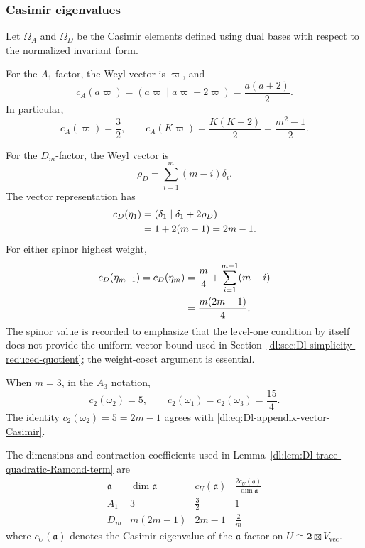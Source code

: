 \documentclass[11pt,reqno]{amsart}
\theoremstyle{definition}
\theoremstyle{remark}
\begin{document}
\subsubsection{Casimir eigenvalues}


Let \(\Omega_A\) and \(\Omega_D\) be the Casimir elements defined using
dual bases with respect to the normalized invariant form.

For the \(A_1\)-factor, the Weyl vector is \(\varpi\), and
\begin{equation*}
  c_A(a\varpi)
  =
  (a\varpi\mid a\varpi+2\varpi)
  =
  \frac{a(a+2)}2.
\end{equation*}
In particular,
\begin{equation*}
  c_A(\varpi)=\frac32,
  \qquad
  c_A(K\varpi)
  =
  \frac{K(K+2)}2
  =
  \frac{m^2-1}{2}.
\end{equation*}

For the \(D_m\)-factor, the Weyl vector is
\begin{equation*}
  \rho_D
  =
  \sum_{i=1}^{m}(m-i)\delta_i.
\end{equation*}
The vector representation has
\begin{align}
  c_D(\eta_1)
  &=
  (\delta_1\mid\delta_1+2\rho_D)
  \notag\\
  &=
  1+2(m-1)
  =
  2m-1.
  \label{dl:eq:Dl-appendix-vector-Casimir}
\end{align}
For either spinor highest weight,
\begin{align*}
  c_D(\eta_{m-1})
  =
  c_D(\eta_m)
  &=
  \frac m4
  +
  \sum_{i=1}^{m-1}(m-i)
  \notag\\
  &=
  \frac{m(2m-1)}4.
\end{align*}
The spinor value is recorded to emphasize that the level-one
condition by itself does not provide the uniform vector bound used in
Section~\ref{dl:sec:Dl-simplicity-reduced-quotient}; the weight-coset
argument is essential.

When \(m=3\), in the \(A_3\) notation,
\begin{equation*}
  c_2(\omega_2)=5,
  \qquad
  c_2(\omega_1)=c_2(\omega_3)=\frac{15}{4}.
\end{equation*}
The identity
\(c_2(\omega_2)=5=2m-1\) agrees with
\eqref{dl:eq:Dl-appendix-vector-Casimir}.

The dimensions and contraction coefficients used in
Lemma~\ref{dl:lem:Dl-trace-quadratic-Ramond-term} are
\begin{equation*}
\begin{array}{c|c|c|c}
  \mathfrak a
  &
  \dim\mathfrak a
  &
  c_U(\mathfrak a)
  &
  \displaystyle
  \frac{2c_U(\mathfrak a)}{\dim\mathfrak a}
  \\ \hline
  A_1
  &
  3
  &
  \frac32
  &
  1
  \\[2mm]
  D_m
  &
  m(2m-1)
  &
  2m-1
  &
  \frac2m
\end{array}
\end{equation*}
where \(c_U(\mathfrak a)\) denotes the Casimir eigenvalue of the
\(\mathfrak a\)-factor on
\(U\cong\mathbf2\boxtimes V_{\mathrm{vec}}\).
\end{document}

